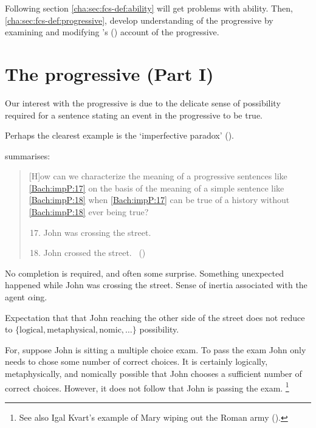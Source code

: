 \begin{note}
  Following section \autoref{cha:sec:fcs-def:ability} will get problems with ability.
  Then, \autoref{cha:sec:fcs-def:progressive}, develop understanding of the progressive by examining and modifying \citeauthor{Landman:1992wh}'s (\citeyear{Landman:1992wh}) account of the progressive.
\end{note}

\section{The progressive (Part I)}
\label{cha:fcs:sec:progressive}

\begin{note}
  Our interest with the progressive is due to the delicate sense of possibility required for a sentence stating an event in the progressive to be true.

  Perhaps the clearest example is the `imperfective paradox' (\citeyear[cf.][Ch.3.1]{Dowty:1979vq}).

  \citeauthor{Bach:1986tb} summarises:
  \begin{quote}
    [H]ow can we characterize the meaning of a progressive sentences like \ref{Bach:impP:17} on the basis of the meaning of a simple sentence like \ref{Bach:impP:18} when \ref{Bach:impP:17} can be true of a history without \ref{Bach:impP:18} ever being true?
    \begin{enumerate}[label=(\arabic*), ref=(\arabic*)]
      \setcounter{enumi}{16}
    \item
      \label{Bach:impP:17}
      John was crossing the street.
    \item
      \label{Bach:impP:18}
      John crossed the street.%
      \mbox{ }\hfill\mbox{(\citeyear[12]{Bach:1986tb})}
    \end{enumerate}
  \end{quote}

  No completion is required, and often some surprise.
  Something unexpected happened while John was crossing the street.
  Sense of inertia associated with the agent \(\alpha\)ing.

  Expectation that that John reaching the other side of the street does not reduce to \(\{\text{logical}, \text{metaphysical}, \text{nomic}, \dots\}\) possibility.

  For, suppose John is sitting a multiple choice exam.
  To pass the exam John only needs to chose some number of correct choices.
  It is certainly logically, metaphysically, and nomically possible that John chooses a sufficient number of correct choices.
  However, it does not follow that John is passing the exam.%
  \footnote{
    See also Igal Kvart's example of Mary wiping out the Roman army (\cite[18]{Landman:1992wh}).
  }


\end{note}
